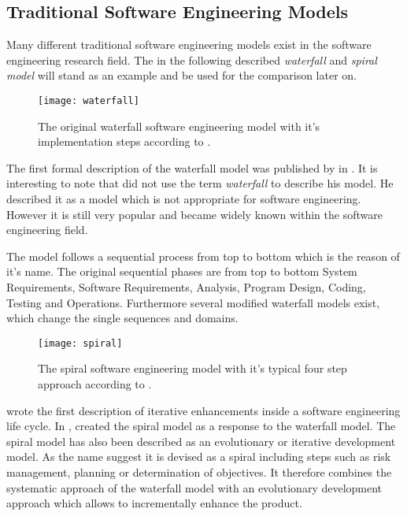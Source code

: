 \subsection{Traditional Software Engineering Models} %

Many different traditional software engineering models exist in the software
engineering research field. The in the following described \emph{waterfall} and
\emph{spiral model} will stand as an example and be used for the comparison
later on.

\begin{figure}[htbp]
  \centering
  \texttt{[image: waterfall]}
  \caption{The original waterfall software engineering model with it's
    implementation steps according to \textcite{Royce1970}.}
\end{figure}

The first formal description of the waterfall model was published by
\textcite{Royce1970} in \citeyear{Royce1970}. It is interesting to note that
\citeauthor{Royce1970} did not use the term \emph{waterfall} to describe his
model. He described it as a model which is not appropriate for software
engineering. However it is still very popular and became widely known within
the software engineering field.

The model follows a sequential process from top to bottom which is the reason
of it's name. The original sequential phases are from top to bottom System
Requirements, Software Requirements, Analysis, Program Design, Coding, Testing
and Operations. Furthermore several modified waterfall models exist, which
change the single sequences and domains.

\begin{figure}[htbp]
  \centering
  \texttt{[image: spiral]}
  \caption{The spiral software engineering model with it's typical four step
    approach according to \textcite{Boehm1988}.}
\end{figure}

\textcite{Basili1975} wrote the first description of iterative enhancements
inside a software engineering life cycle. In \citeyear{Boehm1988},
\textcite{Boehm1988} created the spiral model as a response to the waterfall
model. The spiral model has also been described as an evolutionary or iterative
development model. As the name suggest it is devised as a spiral including
steps such as risk management, planning or determination of objectives. It
therefore combines the systematic approach of the waterfall model with an
evolutionary development approach which allows to incrementally enhance the
product.

